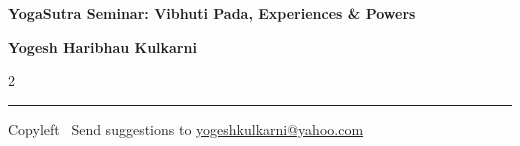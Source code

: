 \documentclass[9pt,a4paper,landscape]{article}
\begin{document}
\footnotesize

\begin{center}
\Large{\textbf{YogaSutra Seminar: Vibhuti Pada, Experiences \& Powers}}

\small{\textbf{Yogesh Haribhau Kulkarni}}
\end{center}

\begin{multicols}{2}

\end{multicols}

\rule{\linewidth}{0.25pt}
\scriptsize
Copyleft \textcopyleft\  Send suggestions to
\href{http://www.yogeshkulkarni.com}{yogeshkulkarni@yahoo.com}
\end{document}

